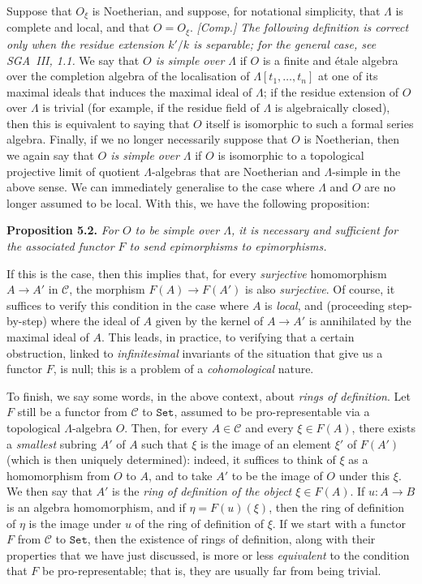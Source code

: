 \documentclass{article}
\newenvironment{itenv}[1]
  {\phantomsection\par\medskip\noindent\textbf{#1.}\itshape}
  {\par\medskip}
\renewcommand{\cal}[1]{{\mathcal{#1}}}
\newcommand{\Set}{\mathtt{Set}}
\newcommand{\oldpage}[1]{\marginpar{\footnotesize$\Big\vert$ \textit{p.~#1}}}
\begin{document}
Suppose that $O_\xi$ is Noetherian, and suppose, for notational simplicity, that $\Lambda$ is complete and local, and that $O=O_\xi$.
\emph{[Comp.] The following definition is correct only when the residue extension $k'/k$ is \emph{separable}; for the general case, see SGA~III, 1.1.}
We say that \emph{$O$ is simple over $\Lambda$} if $O$ is a finite and \'{e}tale algebra over the completion algebra of the localisation of $\Lambda[t_1,\ldots,t_n]$ at one of its maximal ideals that induces the maximal ideal of $\Lambda$;
if the residue extension of $O$ over $\Lambda$ is trivial (for example, if the residue field of $\Lambda$ is algebraically closed), then this is equivalent to saying that $O$ itself is isomorphic to such a formal series algebra.
Finally, if we no longer necessarily suppose that $O$ is Noetherian, then we again say that \emph{$O$ is simple over $\Lambda$} if $O$ is isomorphic to a topological projective limit of quotient $\Lambda$-algebras that are Noetherian and $\Lambda$-simple in the above sense.
We can immediately generalise to the case where $\Lambda$ and $O$ are no longer assumed to be local.
With this, we have the following proposition:

\begin{itenv}{Proposition 5.2}
\label{A.5-proposition2}
  For $O$ to be simple over $\Lambda$, it is necessary and sufficient for the associated functor $F$ to send epimorphisms to epimorphisms.
\end{itenv}

If this is the case, then this implies that, for every \emph{surjective} homomorphism $A\to A'$ in $\cal{C}$, the morphism $F(A)\to F(A')$ is also \emph{surjective}.
Of course, it suffices to verify this condition in the case where $A$ is \emph{local}, and (proceeding step-by-step) where the ideal of $A$ given by the kernel of $A\to A'$ is annihilated by the maximal ideal of $A$.
This leads, in practice, to verifying that a certain obstruction, linked to \emph{infinitesimal} invariants
\oldpage{195-09}
of the situation that give us a functor $F$, is null;
this is a problem of a \emph{cohomological} nature.

To finish, we say some words, in the above context, about \emph{rings of definition}.
Let $F$ still be a functor from $\cal{C}$ to $\Set$, assumed to be pro-representable via a topological $\Lambda$-algebra $O$.
Then, for every $A\in\cal{C}$ and every $\xi\in F(A)$, there exists a \emph{smallest} subring $A'$ of $A$ such that $\xi$ is the image of an element $\xi'$ of $F(A')$ (which is then uniquely determined):
indeed, it suffices to think of $\xi$ as a homomorphism from $O$ to $A$, and to take $A'$ to be the image of $O$ under this $\xi$.
We then say that $A'$ is the \emph{ring of definition of the object $\xi\in F(A)$}.
If $u\colon A\to B$ is an algebra homomorphism, and if $\eta=F(u)(\xi)$, then the ring of definition of $\eta$ is the image under $u$ of the ring of definition of $\xi$.
If we start with a functor $F$ from $\cal{C}$ to $\Set$, then the existence of rings of definition, along with their properties that we have just discussed, is more or less \emph{equivalent} to the condition that $F$ be pro-representable;
that is, they are usually far from being trivial.
\end{document}
